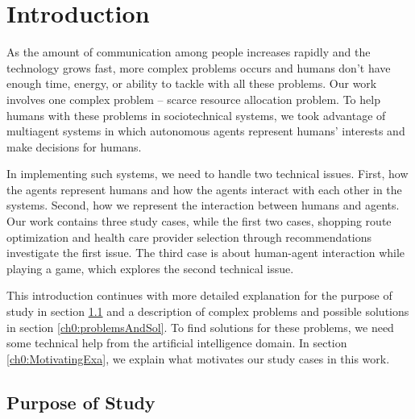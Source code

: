 \chapter{Introduction}
\label{ch0}

As the amount of communication among people increases rapidly and the technology grows fast, more complex problems occurs and humans don't have enough time, energy, or ability to tackle with all these problems. Our work involves one complex problem -- scarce resource allocation problem. To help humans with these problems in sociotechnical systems, we took advantage of multiagent systems in which autonomous agents represent humans' interests and make decisions for humans. 

In implementing such systems, we need to handle two technical issues. First, how the agents represent humans and how the agents interact with each other in the systems. Second, how we represent the interaction between humans and agents. Our work contains three study cases, while the first two cases, shopping route optimization and health care provider selection through recommendations investigate the first issue. The third case is about human-agent interaction while playing a game, which explores the second technical issue. 

This introduction continues with more detailed explanation for the purpose of study in section \ref{ch0:PurposeOfStu} and a description of complex problems and possible solutions in section \ref{ch0:problemsAndSol}. To find solutions for these problems, we need some technical help from the artificial intelligence domain. In section \ref{ch0:MotivatingExa}, we explain what motivates our study cases in this work.

\section{Purpose of Study}
\label{ch0:PurposeOfStu}

